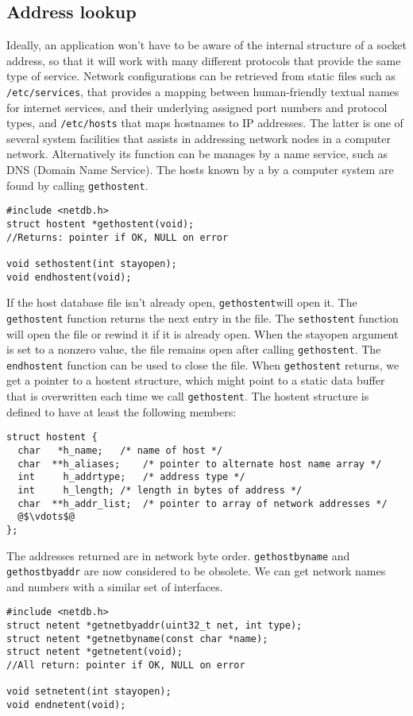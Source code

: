 \documentclass[12pt, letterpaper]{article}
\theoremstyle{definition}
\let\cd\lstinline
\begin{document}
\subsection{Address lookup}
Ideally, an application won't have to be aware of the internal structure of a socket address, so that it will work with many different protocols that provide the same type of service. Network configurations can be retrieved from static files such as \cd+/etc/services+, that provides a mapping between human-friendly textual names for internet services, and their underlying assigned port numbers and protocol types, and \cd+/etc/hosts+ that maps hostnames to IP addresses. The latter is one of several system facilities that assists in addressing network nodes in a computer network. Alternatively its function can be manages by a name service, such as DNS (Domain Name Service). The hosts known by a by a computer system are found by calling \cd+gethostent+.
\begin{lstlisting}
#include <netdb.h>
struct hostent *gethostent(void);
//Returns: pointer if OK, NULL on error

void sethostent(int stayopen);
void endhostent(void);
\end{lstlisting}
If the host database file isn't already open, \cd+gethostent+will open it. The \cd+gethostent+ function returns the next entry in the file. The \cd+sethostent+ function will open the file or rewind it if it is already open. When the stayopen argument is set to a nonzero value, the file remains open after calling \cd+gethostent+. The \cd+endhostent+ function can be used to close the file.
When \cd+gethostent+ returns, we get a pointer to a hostent structure, which might point to a static data buffer that is overwritten each time we call \cd+gethostent+. The hostent structure is defined to have at least the following members:
\begin{lstlisting}
struct hostent {
  char   *h_name;	/* name of host */
  char  **h_aliases;	/* pointer to alternate host name array */
  int     h_addrtype;	/* address type */
  int     h_length;	/* length in bytes of address */
  char  **h_addr_list;	/* pointer to array of network addresses */
  @$\vdots$@
};
\end{lstlisting}
The addresses returned are in network byte order. \cd+gethostbyname+ and \cd+gethostbyaddr+ are now considered to be obsolete. We can get network names and numbers with a similar set of interfaces.
\begin{lstlisting}
#include <netdb.h>
struct netent *getnetbyaddr(uint32_t net, int type);
struct netent *getnetbyname(const char *name);
struct netent *getnetent(void);
//All return: pointer if OK, NULL on error

void setnetent(int stayopen);
void endnetent(void);
\end{lstlisting}
\end{document}
